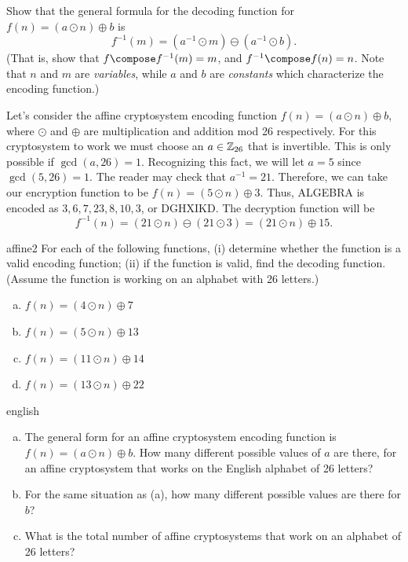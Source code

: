 \begin{exercise}{}
 Show that the  general formula for the decoding function for $f(n) = (a \odot n) \oplus b$ is
$$
f^{-1}(m) = (a^{-1} \odot m)  \ominus (a^{-1}\odot b).
$$
 (That is, show that $f \compose f^{-1}(m)=m$, and $ f^{-1}\compose  f(n) =  n$. Note that  $n$ and $m$ are \emph{variables}, while $a$ and $b$ are \emph{constants} which characterize the encoding function.)
\end{exercise}

\begin{example}{}
Let's consider the affine cryptosystem encoding function $f(n) = (a \odot n) \oplus  b$, where $\odot$ and $\oplus$ are multiplication and addition mod 26 respectively.  For
this cryptosystem to work we must choose an $a \in {\Bbb Z}_{26}$
that is invertible. This is only possible if $\gcd(a, 26) = 1$.
Recognizing this fact, we will let $a = 5$ since $\gcd(5, 26) = 1$. The reader may check that $a^{-1} = 21$. Therefore, we can take our
encryption function to be $f(n) = (5 \odot n) \oplus 3$. Thus, ALGEBRA is
encoded as $3, 6, 7, 23, 8, 10, 3$, or DGHXIKD. The decryption
function will be   
$$
f^{-1}(n) = (21 \odot  n) \ominus (21\odot 3)  =(21 \odot  n) \oplus 15.
$$
\end{example}

\begin{exercise}{affine2}
For each of the following functions, (i) determine whether the function is a valid encoding function; (ii) if the function is valid, find the decoding function. (Assume the function is working on an alphabet with 26 letters.)
\begin{enumerate}[(a)]
\item
$f(n) = (4 \odot n) \oplus 7$
\item
$f(n) = (5 \odot n) \oplus 13$
\item
$f(n) = (11 \odot n) \oplus 14$
\item
$f(n) = (13 \odot n) \oplus 22$
\end{enumerate}
\end{exercise}


\begin{exercise}{english}
\begin{enumerate}[(a)]
\item
The general form for an affine cryptosystem encoding function is $f(n) = (a \odot n) \oplus  b$. How many different possible values of $a$ are there, for an affine cryptosystem that works on the English alphabet of 26 letters?
\item
For the same situation as (a), how many different possible values are there for $b$?
\item
What is the total number of affine cryptosystems that work on an alphabet of 26 letters?
\end{enumerate}
\end{exercise}

